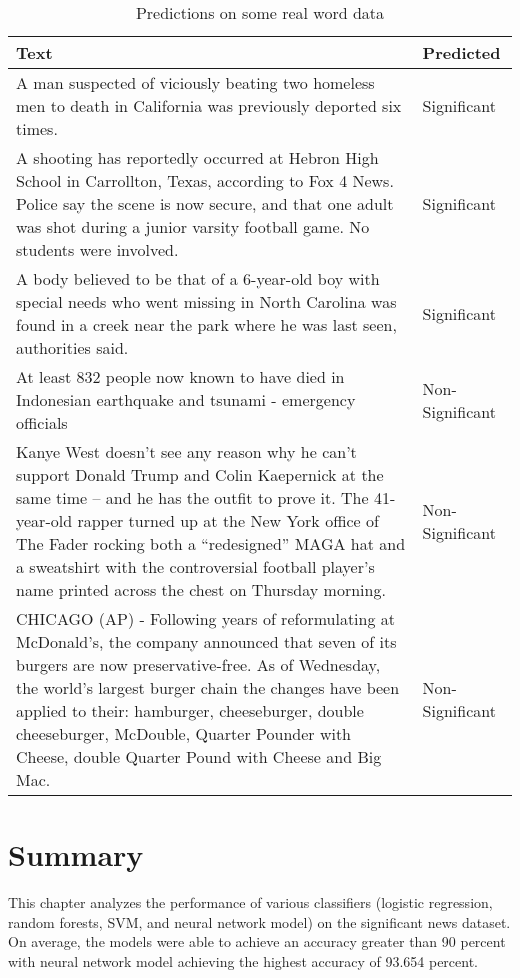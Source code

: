 \begin{table}
\begin{center}
\caption{Predictions on some real word data}
\label{tbl:real_prediction}
\begin{tabular}{p{12cm}p{2.5cm}}
\toprule 
Text&Predicted\\
\midrule 
A man suspected of viciously beating two homeless men to death in California was previously deported six times. &Significant \\
\hline
A shooting has reportedly occurred at Hebron High School in Carrollton, Texas, according to Fox 4 News.  Police say the scene is now secure, and that one adult was shot during a junior varsity football game. No students were involved. &Significant \\
\hline
A body believed to be that of a 6-year-old boy with special needs who went missing in North Carolina was found in a creek near the park where he was last seen, authorities said.&Significant \\
\hline
At least 832 people now known to have died in Indonesian earthquake and tsunami - emergency officials &Non-Significant \\
\hline
Kanye West doesn’t see any reason why he can’t support Donald Trump and Colin Kaepernick at the same time – and he has the outfit to prove it.  The 41-year-old rapper turned up at the New York office of The Fader rocking both a “redesigned” MAGA hat and a sweatshirt with the controversial football player’s name printed across the chest on Thursday morning.&Non-Significant \\
\hline
CHICAGO (AP) - Following years of reformulating at McDonald's, the company announced that seven of its burgers are now preservative-free. As of Wednesday, the world's largest burger chain the changes have been applied to their: hamburger, cheeseburger, double cheeseburger, McDouble, Quarter Pounder with Cheese, double Quarter Pound with Cheese and Big Mac. &Non-Significant \\
\bottomrule
\end{tabular}
\end{center}
\end{table}

\section{Summary}
This chapter analyzes the performance of various classifiers (logistic regression, random forests, SVM, and neural network model) on the significant news dataset. %
On average, the models were able to achieve an accuracy greater than 90 percent with neural network model achieving the highest accuracy of 93.654 percent.